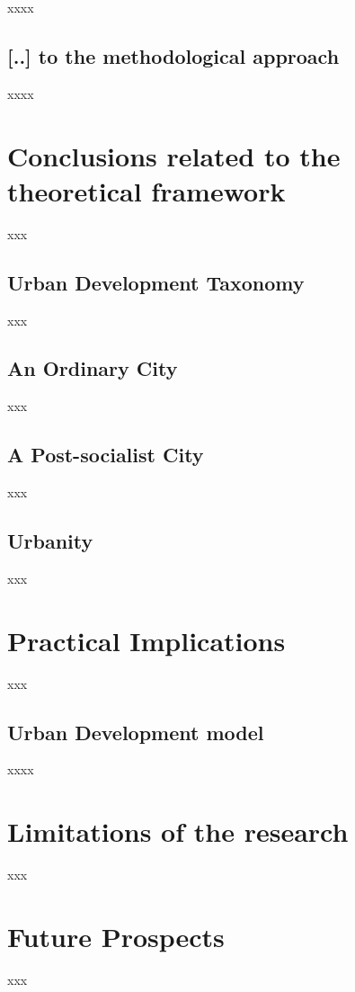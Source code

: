 \documentclass[11pt]{report}
\begin{document}
xxxx

\subsection{[..] to the methodological approach}

xxxx

\section{Conclusions related to the theoretical framework}

xxx

\subsection{Urban Development Taxonomy}

xxx

\subsection{An Ordinary City}

xxx

\subsection{A Post-socialist City}

xxx

\subsection{Urbanity}

xxx

\section{Practical Implications}

xxx

\subsection{Urban Development model}

xxxx

\section{Limitations of the research}

xxx

\section{Future Prospects}

xxx



\begin{small}

\end{small}



\newpage
\appendix
\noappendicestocpagenum
\addappheadtotoc
\end{document}
